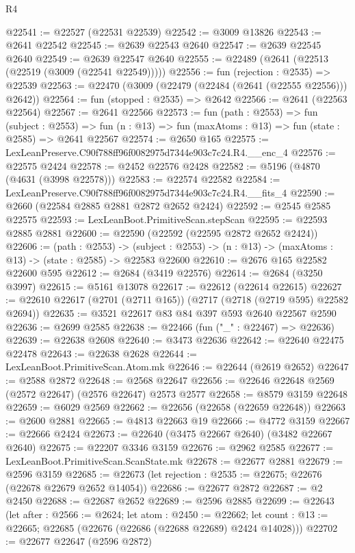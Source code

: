\begin{lexlean}{R4}
\begin{coremodule}
@22541 := @22527 (@22531 @22539)
@22542 := @3009 @13826
@22543 := @2641 @22542
@22545 := @2639 @22543 @2640
@22547 := @2639 @22545 @2640
@22549 := @2639 @22547 @2640
@22555 := @22489 (@2641 (@22513 (@22519 (@3009 (@22541 @22549)))))
@22556 := fun (rejection : @2535) => @22539
@22563 := @22470 (@3009 (@22479 (@22484 (@2641 (@22555 @22556))) @2642))
@22564 := fun (stopped : @2535) => @2642
@22566 := @2641 (@22563 @22564)
@22567 := @2641 @22566
@22573 := fun (path : @2553) =>
  fun (subject : @2553) =>
  fun (n : @13) => fun (maxAtoms : @13) => fun (state : @2585) => @2641 @22567
@22574 := @2650 @165
@22575 := LexLeanPreserve.C90f788ff96f0082975d7344e903c7c24.R4.__enc_4
@22576 := @22575 @2424
@22578 := @2452 @22576 @2428
@22582 := @5196 (@4870 (@4631 (@3998 @22578)))
@22583 := @22574 @22582
@22584 := LexLeanPreserve.C90f788ff96f0082975d7344e903c7c24.R4.__fits_4
@22590 := @2660 (@22584 @2885 @2881 @2872 @2652 @2424)
@22592 := @2545 @2585 @22575
@22593 := LexLeanBoot.PrimitiveScan.stepScan
@22595 := @22593 @2885 @2881
@22600 := @22590 (@22592 (@22595 @2872 @2652 @2424))
@22606 := (path : @2553) ->
  (subject : @2553) -> (n : @13) -> (maxAtoms : @13) -> (state : @2585) -> @22583 @22600
@22610 := @2676 @165 @22582 @22600 @595
@22612 := @2684 (@3419 @22576)
@22614 := @2684 (@3250 @3997)
@22615 := @5161 @13078
@22617 := @22612 (@22614 @22615)
@22627 := @22610 @22617 (@2701 (@2711 @165)) (@2717 (@2718 (@2719 @595) @22582 @2694))
@22635 := @3521 @22617 @83 @84 @397 @593 @2640 @22567 @2590
@22636 := @2699 @2585
@22638 := @22466 (fun ("_" : @22467) => @22636)
@22639 := @22638 @2608
@22640 := @3473 @22636
@22642 := @22640 @22475 @22478
@22643 := @22638 @2628
@22644 := LexLeanBoot.PrimitiveScan.Atom.mk
@22646 := @22644 (@2619 @2652)
@22647 := @2588 @2872
@22648 := @2568 @22647
@22656 := @22646 @22648 @2569 (@2572 @22647) (@2576 @22647) @2573 @2577
@22658 := @8579 @3159 @22648
@22659 := @6029 @2569
@22662 := @22656 (@22658 (@22659 @22648))
@22663 := @2600 @2881
@22665 := @4813 @22663 @19
@22666 := @4772 @3159
@22667 := @22666 @2424
@22673 := @22640 (@3475 @22667 @2640) (@3482 @22667 @2640)
@22675 := @22207 @3346 @3159
@22676 := @2962 @2585
@22677 := LexLeanBoot.PrimitiveScan.ScanState.mk
@22678 := @22677 @2881
@22679 := @2596 @3159
@22685 := @22673 (let rejection : @2535 := @22675; @22676 (@22678 @22679 @2652 @14054))
@22686 := @22677 @2872
@22687 := @2 @2450
@22688 := @22687 @2652
@22689 := @2596 @2885
@22699 := @22643
    (let after : @2566 := @2624;
    let atom : @2450 := @22662;
    let count : @13 := @22665; @22685 (@22676 (@22686 (@22688 @22689) @2424 @14028)))
@22702 := @22677 @22647 (@2596 @2872)

\end{coremodule}
\end{lexlean}
